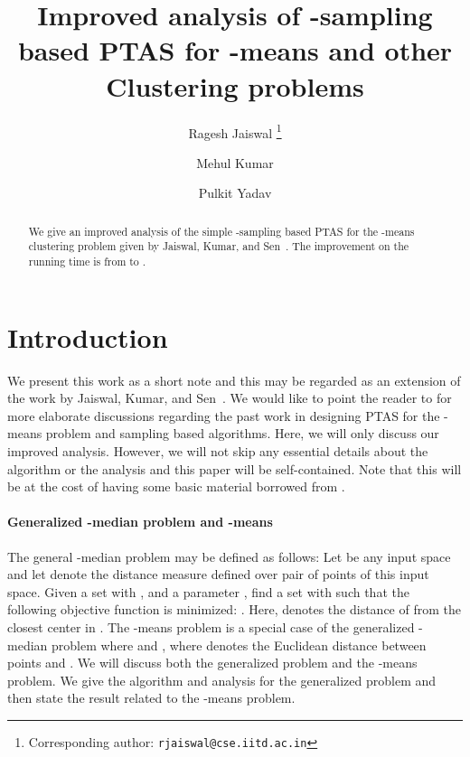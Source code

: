 \documentclass[11pt]{article}
\begin{document}
\title{Improved analysis of -sampling based PTAS for -means and other Clustering problems}

\author[1]{Ragesh Jaiswal \thanks{Corresponding author: \texttt{rjaiswal@cse.iitd.ac.in}}}
\author[1]{Mehul Kumar}
\author[1]{Pulkit Yadav}


\date{}

\maketitle

\begin{abstract}
We give an improved analysis of the simple -sampling based PTAS for the -means clustering problem given by Jaiswal, Kumar, and Sen~\cite{jks12}.
The improvement on the running time is from  to .
\end{abstract}


\section{Introduction}
We present this work as a short note and this may be regarded as an extension of the work by Jaiswal, Kumar, and Sen~\cite{jks12}.
We would like to point the reader to \cite{jks12} for more elaborate discussions regarding the past work in designing PTAS for the -means problem and sampling based algorithms.
Here, we will only discuss our improved analysis.
However, we will not skip any essential details about the algorithm or the analysis and this paper will be self-contained.
Note that this will be at the cost of having some basic material borrowed from \cite{jks12}.


\paragraph{Generalized -median problem and -means} 
The general -median problem may be defined as follows: 
Let  be any input space and let  denote the distance measure defined over pair of points of this input space. 
Given a set  with , and a parameter , find a set  with  such that the following objective function is minimized: .
Here,  denotes the distance of  from the closest center in .
The -means problem is a special case of the generalized -median problem where  and , where  denotes the Euclidean distance between points  and .
We will discuss both the generalized problem and the -means problem.
We give the algorithm and analysis for the generalized problem and then state the result related to the -means problem.
\end{document}
